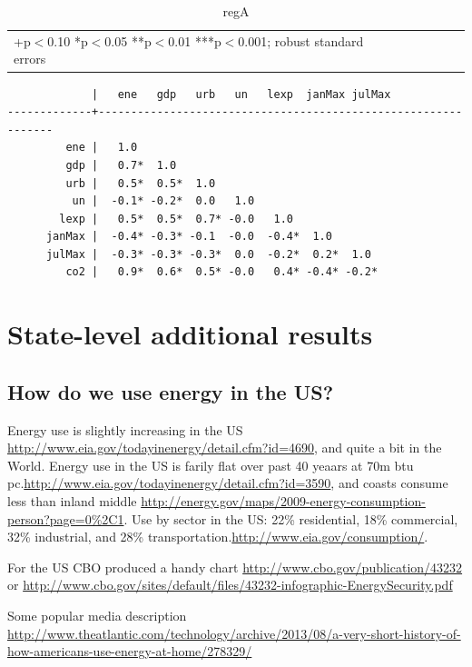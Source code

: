 \documentclass[10pt, letterpaper]{article}
\begin{document}
\begin{spacing}{1.4}
\begin{table}[H]\centering \caption{regA} \label{regA} \begin{scriptsize} \begin{tabular}{p{1.4in}p{.43in}p{.43in}p{.43in}p{.43in}p{.43in}p{.43in}p{.43in}p{.43in}p{.43in}p{.43 in}p{.43in}p{.43 in}}\hline  \hline\multicolumn{6}{l}{+p$<$0.10 *p$<$0.05 **p$<$0.01 ***p$<$0.001; robust standard errors} \end{tabular}\end{scriptsize}\end{table}

\begin{verbatim}
             |   ene   gdp   urb   un   lexp  janMax julMax
-------------+---------------------------------------------------------------
         ene |   1.0 
         gdp |   0.7*  1.0 
         urb |   0.5*  0.5*  1.0 
          un |  -0.1* -0.2*  0.0   1.0 
        lexp |   0.5*  0.5*  0.7* -0.0   1.0 
      janMax |  -0.4* -0.3* -0.1  -0.0  -0.4*  1.0 
      julMax |  -0.3* -0.3* -0.3*  0.0  -0.2*  0.2*  1.0 
         co2 |   0.9*  0.6*  0.5* -0.0   0.4* -0.4* -0.2*

\end{verbatim}

\section{State-level additional results}
\subsection{How do we use energy in the US?}

Energy use is slightly increasing in the US
\url{http://www.eia.gov/todayinenergy/detail.cfm?id=4690}, and quite a bit in
the World. 
Energy use in the US is farily flat over past 40 yeaars at 70m btu
pc.\url{http://www.eia.gov/todayinenergy/detail.cfm?id=3590}, and coasts consume
less than inland middle
\url{http://energy.gov/maps/2009-energy-consumption-person?page=0%2C1}. 
Use by sector in the US: 22\% residential, 18\% commercial, 32\% industrial, and
28\% transportation.\url{http://www.eia.gov/consumption/}. 


For the US CBO produced a handy chart \url{http://www.cbo.gov/publication/43232} or \url{http://www.cbo.gov/sites/default/files/43232-infographic-EnergySecurity.pdf}

Some popular media description
\url{http://www.theatlantic.com/technology/archive/2013/08/a-very-short-history-of-how-americans-use-energy-at-home/278329/}


\end{spacing}
\end{document}
